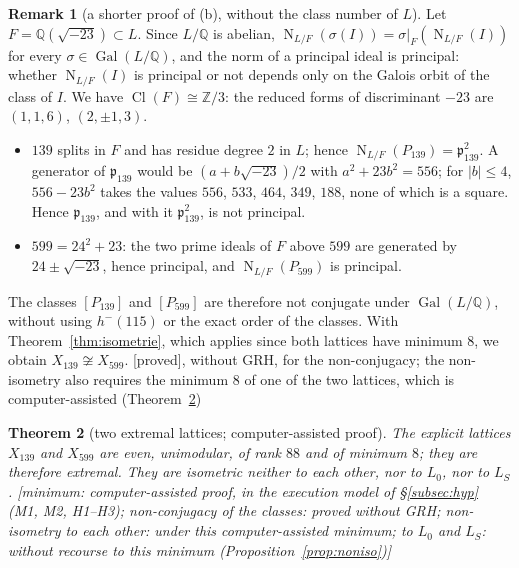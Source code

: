 \documentclass[11pt,a4paper]{amsart}
\theoremstyle{plain}
\newtheorem{theorem}{Theorem}[section]
\theoremstyle{definition}
\newtheorem{remark}[theorem]{Remark}
\numberwithin{equation}{section}
\newcommand{\Q}{\mathbb{Q}}
\newcommand{\Z}{\mathbb{Z}}
\DeclareMathOperator{\Nm}{N}
\DeclareMathOperator{\Cl}{Cl}
\DeclareMathOperator{\Gal}{Gal}
\newcommand{\Lz}{L_{0}}
\newcommand{\LS}{L_{S}}
\newcommand{\st}[1]{\textup{\textsf{\small[#1]}}}
\newcommand{\DEM}{\st{proved}}
\begin{document}
\begin{remark}[a shorter proof of (b), without the class number of $L$]\label{rem:normeF}
Let $F=\Q(\sqrt{-23})\subset L$. Since $L/\Q$ is abelian, $\Nm_{L/F}(\sigma(I))=\sigma|_F(\Nm_{L/F}(I))$ for every $\sigma\in\Gal(L/\Q)$, and the norm of a principal ideal is principal: whether $\Nm_{L/F}(I)$ is principal or not depends only on the Galois orbit of the class of $I$. We have $\Cl(F)\cong\Z/3$: the reduced forms of discriminant $-23$ are $(1,1,6)$, $(2,\pm1,3)$.
\begin{itemize}
\item $139$ splits in $F$ and has residue degree $2$ in $L$; hence $\Nm_{L/F}(P_{139})=\mathfrak p_{139}^2$. A generator of $\mathfrak p_{139}$ would be $(a+b\sqrt{-23})/2$ with $a^2+23b^2=556$; for $|b|\le4$, $556-23b^2$ takes the values $556$, $533$, $464$, $349$, $188$, none of which is a square. Hence $\mathfrak p_{139}$, and with it $\mathfrak p_{139}^2$, is not principal.
\item $599=24^2+23$: the two prime ideals of $F$ above $599$ are generated by $24\pm\sqrt{-23}$, hence principal, and $\Nm_{L/F}(P_{599})$ is principal.
\end{itemize}
The classes $[P_{139}]$ and $[P_{599}]$ are therefore not conjugate under $\Gal(L/\Q)$, without using $h^-(115)$ or the exact order of the classes. With Theorem~\ref{thm:isometrie}, which applies since both lattices have minimum $8$, we obtain $X_{139}\not\cong X_{599}$. \DEM, without GRH, for the non-conjugacy; the non-isometry also requires the minimum $8$ of one of the two lattices, which is computer-assisted (Theorem~\ref{thm:extremaux})
\end{remark}


\begin{theorem}[two extremal lattices; computer-assisted proof]\label{thm:extremaux}
The explicit lattices $X_{139}$ and $X_{599}$ are even, unimodular, of rank $88$ and of minimum $8$; they are therefore extremal. They are isometric neither to each other, nor to $\Lz$, nor to $\LS$.
\st{minimum: computer-assisted proof, in the execution model of \S\ref{subsec:hyp} (M1, M2, H1--H3); non-conjugacy of the classes: proved without GRH; non-isometry to each other: under this computer-assisted minimum; to $\Lz$ and $\LS$: without recourse to this minimum (Proposition~\ref{prop:noniso})}
\end{theorem}
\end{document}

